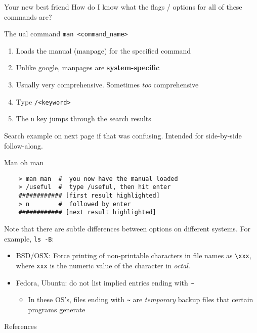 \begin{frame}[fragile]{Your new best friend}
  How do I know what the flags / options for all of these commands are?

  \begin{block}{The ual command}
    \texttt{man <command\_name>}
    \begin{enumerate}[\--]
      \item Loads the manual (manpage) for the specified command
      \item Unlike google, manpages are \textbf{system-specific}
      \item Usually very comprehensive.  Sometimes \emph{too} comprehensive
      \item Type \texttt{/<keyword>}
      \item The \texttt{n} key jumps through the search results
    \end{enumerate}
  \end{block}
  Search example on next page if that was confusing.  Intended for side-by-side follow-along.
\end{frame}

\begin{frame}[fragile]{Man oh man}
  \begin{verbatim}
    > man man  #  you now have the manual loaded
    > /useful  #  type /useful, then hit enter
    ############ [first result highlighted]
    > n        #  followed by enter
    ############ [next result highlighted]
  \end{verbatim}
  Note that there are subtle differences between options on different systems.  For example, \texttt{ls -B}:
  \begin{itemize}
    \item BSD/OSX: Force printing of non-printable characters in file names as \texttt{\textbackslash xxx},
          where \texttt{xxx} is the numeric value of the character in \emph{octal}.
    \item Fedora, Ubuntu: do not list implied entries ending with \texttt{\textasciitilde}
    \begin{itemize}
      \item In these OS's, files ending with \texttt{\textasciitilde} are \emph{temporary} backup files that
            certain programs generate
    \end{itemize}
  \end{itemize}
\end{frame}

%

\begin{frame}[allowframebreaks]{References}
  
  
\end{frame}


